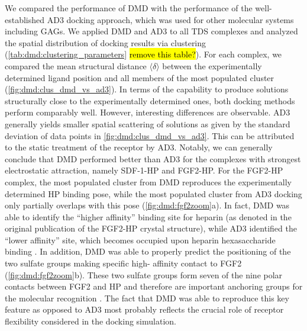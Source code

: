 We compared the performance of DMD with the performance of the well-established
AD3 docking approach, which was used for other molecular systems including GAGs.
We applied DMD and AD3 to all TDS complexes and analyzed the spatial
distribution of docking results via clustering
(\cref{tab:dmd:clustering_parameters} \hl{remove this table?}). For each
complex, we compared the mean structural distance $\langle \delta \rangle$
between the experimentally determined ligand position and all members of the
most populated cluster (\cref{fig:dmd:clus_dmd_vs_ad3}). In terms of the
capability to produce solutions structurally close to the experimentally
determined ones, both docking methods perform comparably well. However,
interesting differences are observable. AD3 generally yields smaller spatial
scattering of solutions as given by the standard deviation of data points in
\cref{fig:dmd:clus_dmd_vs_ad3}. This can be attributed to the static treatment
of the receptor by AD3. Notably, we can generally conclude that DMD performed
better than AD3 for the complexes with strongest electrostatic attraction,
namely SDF-1-HP and FGF2-HP. For the FGF2-HP complex, the most populated cluster
from DMD reproduces the experimentally determined HP binding pose, while the
most populated cluster from AD3 docking only partially overlaps with this pose
(\cref{fig:dmd:fgf2zoom}a). In fact, DMD was able to identify the
\enquote{higher affinity} binding site for heparin (as denoted in the original
publication of the FGF2-HP crystal structure), while AD3 identified the
\enquote{lower affinity} site, which becomes occupied upon heparin
hexasaccharide binding \cite{faham_heparin_1996}. In addition, DMD was able to
properly predict the positioning of the two sulfate groups making specific high-
affinity contact to FGF2 (\cref{fig:dmd:fgf2zoom}b). These two sulfate groups
form seven of the nine polar contacts between FGF2 and HP and therefore are
important anchoring groups for the molecular recognition
\cite{faham_heparin_1996}. The fact that DMD was able to reproduce this key
feature as opposed to AD3 most probably reflects the crucial role of receptor
flexibility considered in the docking simulation.

